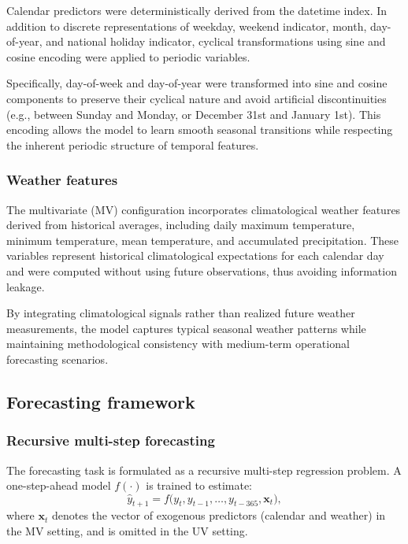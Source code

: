 Calendar predictors were deterministically derived from the datetime index. In addition to discrete representations of weekday, weekend indicator, month, day-of-year, and national holiday indicator, cyclical transformations using sine and cosine encoding were applied to periodic variables.

Specifically, day-of-week and day-of-year were transformed into sine and cosine components to preserve their cyclical nature and avoid artificial discontinuities (e.g., between Sunday and Monday, or December 31st and January 1st). This encoding allows the model to learn smooth seasonal transitions while respecting the inherent periodic structure of temporal features.


\subsubsection{Weather features}

The multivariate (MV) configuration incorporates climatological weather features derived from historical averages, including daily maximum temperature, minimum temperature, mean temperature, and accumulated precipitation. These variables represent historical climatological expectations for each calendar day and were computed without using future observations, thus avoiding information leakage.

By integrating climatological signals rather than realized future weather measurements, the model captures typical seasonal weather patterns while maintaining methodological consistency with medium-term operational forecasting scenarios.

\subsection{Forecasting framework}
\label{subsec:forecasting_framework}

\subsubsection{Recursive multi-step forecasting}
The forecasting task is formulated as a recursive multi-step regression problem. A one-step-ahead model $f(\cdot)$ is trained to estimate:
\begin{equation}
\hat{y}_{t+1} = f\big( y_t, y_{t-1}, \dots, y_{t-365}, \mathbf{x}_t \big),
\end{equation}
where $\mathbf{x}_t$ denotes the vector of exogenous predictors (calendar and weather) in the MV setting, and is omitted in the UV setting.

